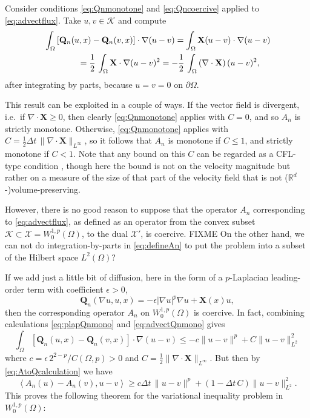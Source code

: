 \documentclass[final,leqno,onefignum,onetabnum]{siamltex1213bueler}
\newcommand\bQ{\mathbf{Q}}
\newcommand\bX{\mathbf{X}}
\newcommand{\Div}{\nabla\cdot}
\newcommand\eps{\epsilon}
\renewcommand{\grad}{\nabla}
\newcommand{\ip}[2]{\ensuremath{\left<#1,#2\right>}}
\newcommand\RR{\mathbb{R}}
\begin{document}
Consider conditions \eqref{eq:Qnmonotone} and \eqref{eq:Qncoercive} applied to \eqref{eq:advectflux}.  Take $u,v\in\mathcal{K}$ and compute
\begin{align}
   &\int_\Omega \left[\bQ_n(u,x) - \bQ_n(v,x)\right] \cdot \grad (u - v) = \int_\Omega \bX (u-v) \cdot \grad (u - v)   \label{eq:advectQnmono} \\
   &\qquad\qquad = \frac{1}{2}\,\int_\Omega \bX \cdot \grad (u - v)^2 = - \frac{1}{2}\,\int_\Omega \left(\Div\bX\right) (u - v)^2, \notag
\end{align}
after integrating by parts, because $u=v=0$ on $\partial \Omega$.

This result can be exploited in a couple of ways.  If the vector field is divergent, i.e.~if $\Div\bX\ge 0$, then clearly \eqref{eq:Qnmonotone} applies with $C=0$, and so $A_n$ is strictly monotone.  Otherwise, \eqref{eq:Qnmonotone} applies with $C = \frac{1}{2}\Delta t\,\|\Div\bX\|_{L^\infty}$, so it follows that $A_n$ is monotone if $C\le 1$, and strictly monotone if $C<1$.  Note that any bound on this $C$ can be regarded as a CFL-type condition \cite{LeVeque}, though here the bound is not on the velocity magnitude but rather on a measure of the size of that part of the velocity field that is not ($\RR^d$-)volume-preserving.

However, there is no good reason to suppose that the operator $A_n$ corresponding to \eqref{eq:advectflux}, as defined as an operator from the convex subset $\mathcal{K} \subset \mathcal{X} = W_0^{1,p}(\Omega)$, to the dual $\mathcal{X}'$, is coercive.  FIXME On the other hand, we can not do integration-by-parts in  \eqref{eq:defineAn} to put the problem into a subset of the Hilbert space $L^2(\Omega)$?

If we add just a little bit of diffusion, here in the form of a $p$-Laplacian leading-order term with coefficient $\eps>0$,
\begin{equation}
  \bQ_n(\grad u,u,x) = -\eps |\grad u|^p \grad u + \bX(x) u,   \label{eq:plapadvectflux}
\end{equation}
then the corresponding operator $A_n$ on $W_0^{1,p}(\Omega)$ is coercive.  In fact, combining calculations \eqref{eq:plapQnmono} and \eqref{eq:advectQnmono} gives
\begin{equation}
\int_\Omega \left[\bQ_n(u,x) - \bQ_n(v,x)\right] \cdot \grad (u - v) \le - c \|u-v\|^p + C \|u-v\|_{L^2}^2
\end{equation}
where $c=\eps\, 2^{2-p}/C(\Omega,p)>0$ and $C = \frac{1}{2}\|\Div\bX\|_{L^\infty}$.  But then by \eqref{eq:AtoQcalculation} we have
\begin{equation}
\ip{A_n(u) - A_n(v)}{u-v} \ge c \Delta t\, \|u-v\|^p + (1-\Delta t\,C) \|u-v\|_{L^2}^2.
\end{equation}
This proves the following theorem for the variational inequality problem in $W_0^{1,p}(\Omega)$:
\end{document}
